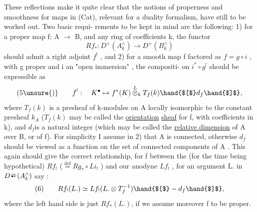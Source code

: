 
These reflections make it quite clear that the  notions
of properness and smoothness for maps in (Cat), relevant for  a duality formalism, have still to be worked out. Two basic requi-%
rements to be kept in mind are the following: 1) for a proper map 
f: A $\longrightarrow$ B, and any ring of coefficients k, the functor
\[ Rf_{*} : D^{+}(A^{\wedge}_{k}) \longrightarrow D^{+}(B^{\wedge}_{k}) \]
should admit a right adjoint $f^{!}$ , and 2) for a smooth map f factored
as $f = g\circ i$ , with g proper and i an "open immersion" , the compositi-%
on $i^{*}\circ g^{!}$\hand{$\leftarrow$} should be  expressible as
\[ (5\unsure{)} \qquad f^{!} : \quad K^{\bullet} \mapsto f^{*}(K)\overset{L}{\otimes}_{k} T_{f}(k)\hand{$[$}d_{f}\hand{$]$} , \]
where $T_{f}(k)$ is a presheaf of k-modules on A locally isomorphic to
the constant  presheaf $k_{A}$ ($T_{f}(k)$ may be called the \uline{orientation}
\uline{sheaf} for f, with coefficients in k), and $d_{f}$\hand{|}is a natural integer
(which may be called the \uline{relative dimension} of A over B, or of f).
\hand{(}For simplicity I assume in 2) that A is connected, otherwise $d_{f}$
should be viewed as a function on the set of connected components of
A .\hand{)} This again should give the correct relationship, for f \hand{,}
between the (for the time being hypothetical) $Rf_{!}$ ($\overset{\mathrm{def}}{=} Rg_{*}\circ Li_{!}$ ) and
 our anodyne $Lf_{!}$ , for an argument L. in $D^{\over{\bullet}{b}}(A^{\wedge}_{k})$ say :
\[ (6) \qquad Rf_{!}(L.) \simeq Lf_{!}(L.\otimes T_{f}^{-1})\hand{$[$}-d_{f}\hand{$]$} , \]
where the  left hand side is just $Rf_{*}(L.)$, if we assume moreover
f to be proper.

